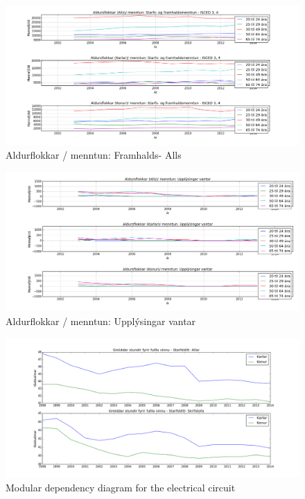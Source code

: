 \documentclass[12pt, svn, draft]{rureport}
\begin{document}
\begin{figure}
	\centering 
	\includegraphics[width=\textwidth]{../graphics/mentun_aldrusflokkar_starfs_og_framhaldsmenntun.png}
	\caption{Aldurflokkar / menntun: Framhalds- Alls \label{fig:menntunfram}}
\end{figure}

\begin{figure}
	\centering 
	\includegraphics[width=\textwidth]{../graphics/mentun_aldrusflokkar_upplysingar_vantar.png}
	\caption{Aldurflokkar / menntun: Upplýsingar vantar \label{fig:menntunvantar}}
\end{figure}

\begin{figure}
	\centering 
	\includegraphics[width=\textwidth]{../graphics/unnir_timar1.png}
	\caption{Modular dependency diagram for the electrical circuit \label{fig:unnirtimar1}}
\end{figure}
\end{document}

